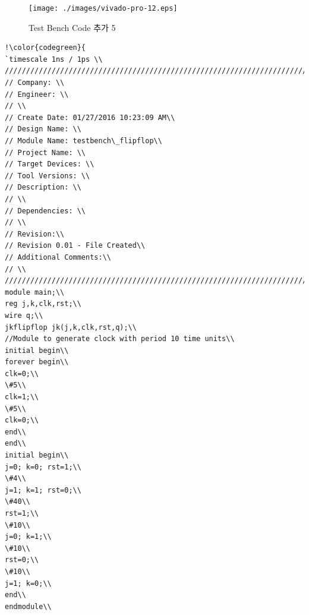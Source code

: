 \documentclass[11pt
  , a4paper
  , article
  , oneside
]{memoir}
\begin{document}
\begin{figure}[h!]
	\centering
	\texttt{[image: ./images/vivado-pro-12.eps]}
	\caption{Test Bench Code 추가 5}
	\label{fig:vivado_12} 
\end{figure}
\clearpage
\begin{lstlisting}[style=termstyle, escapechar=!]
!\color{codegreen}{
`timescale 1ns / 1ps \\
//////////////////////////////////////////////////////////////////////////////////\\
// Company: \\
// Engineer: \\
// \\
// Create Date: 01/27/2016 10:23:09 AM\\
// Design Name: \\
// Module Name: testbench\_flipflop\\
// Project Name: \\
// Target Devices: \\
// Tool Versions: \\
// Description: \\
// \\
// Dependencies: \\
// \\
// Revision:\\
// Revision 0.01 - File Created\\
// Additional Comments:\\
// \\
//////////////////////////////////////////////////////////////////////////////////\\
module main;\\
reg j,k,clk,rst;\\
wire q;\\
jkflipflop jk(j,k,clk,rst,q);\\
//Module to generate clock with period 10 time units\\
initial begin\\
forever begin\\
clk=0;\\
\#5\\
clk=1;\\
\#5\\
clk=0;\\
end\\
end\\
initial begin\\
j=0; k=0; rst=1;\\
\#4\\
j=1; k=1; rst=0;\\
\#40\\
rst=1;\\
\#10\\
j=0; k=1;\\
\#10\\
rst=0;\\
\#10\\
j=1; k=0;\\
end\\
endmodule\\

\end{lstlisting}
\end{document}
